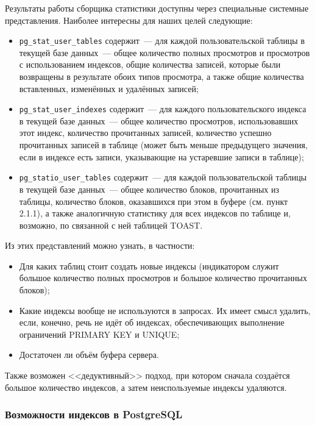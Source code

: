 Результаты работы сборщика статистики доступны через специальные системные представления. Наиболее интересны для наших целей следующие:

\begin{itemize}
  \item \lstinline!pg_stat_user_tables! содержит~--- для каждой пользовательской таблицы в текущей базе данных~--- общее количество полных просмотров и просмотров с использованием индексов, общие количества записей, которые были возвращены в результате обоих типов просмотра, а также общие количества вставленных, изменённых и удалённых записей;
  \item \lstinline!pg_stat_user_indexes! содержит~--- для каждого пользовательского индекса в текущей базе данных~--- общее количество просмотров, использовавших этот индекс, количество прочитанных записей, количество успешно прочитанных записей в таблице (может быть меньше предыдущего значения, если в индексе есть записи, указывающие на устаревшие записи в таблице);
  \item \lstinline!pg_statio_user_tables! содержит~--- для каждой пользовательской таблицы в текущей базе данных~--- общее количество блоков, прочитанных из таблицы, количество блоков, оказавшихся при этом в буфере (см. пункт 2.1.1), а также аналогичную статистику для всех индексов по таблице и, возможно, по связанной с ней таблицей TOAST.
\end{itemize}

Из этих представлений можно узнать, в частности:

\begin{itemize}
 \item Для каких таблиц стоит создать новые индексы (индикатором служит большое количество полных просмотров и большое количество прочитанных блоков);
 \item Какие индексы вообще не используются в запросах. Их имеет смысл удалить, если, конечно, речь не идёт об индексах, обеспечивающих выполнение ограничений PRIMARY KEY и UNIQUE;
 \item Достаточен ли объём буфера сервера.
\end{itemize}

Также возможен <<дедуктивный>> подход, при котором сначала создаётся большое количество индексов, а затем неиспользуемые индексы удаляются.


\subsubsection{Возможности индексов в PostgreSQL}


